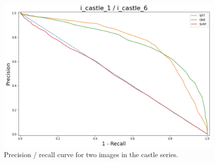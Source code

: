 \begin{figure}[h]
	\centering
	\includegraphics[width=0.68\linewidth]{Materials/PRCurve}
	\caption{Precision / recall curve for two images in the castle series.}
	\label{PRCurve}
\end{figure}